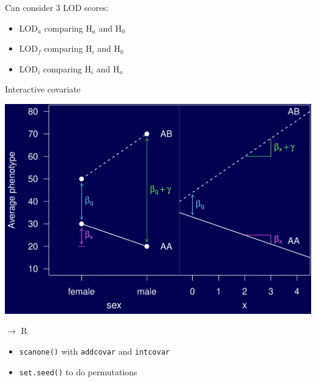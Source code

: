\documentclass[12pt]{article}
\newcommand{\headsize}{\fontsize{35}{35} \selectfont}
\newcommand{\smallsize}{\fontsize{25}{30} \selectfont}
\begin{document}
\hspace{0.5in}
\begin{minipage}{9.5in}
Can consider 3 LOD scores:
  \begin{itemize}
    \item LOD$_a$ comparing H$_a$ and H$_0$
    \item LOD$_f$ comparing H$_i$ and H$_0$
    \item LOD$_i$ comparing H$_i$ and H$_a$
  \end{itemize}
\end{minipage}

\newpage

\headsize \color{myyellow}
\hfill \begin{minipage}{5.75in}
\centering
Interactive covariate
\end{minipage}

\vfill

\centerline{\includegraphics{FigsA/intcovar.pdf}}


\newpage

\headsize \color{myyellow}
$\boldsymbol{\rightarrow}$ R

\vspace{3cm}

\color{mywhite} \smallsize

\hfill \begin{minipage}[t]{9.5in}
\begin{itemize}
\itemsep24pt
\item \verb|scanone()| with \verb|addcovar| and \verb|intcovar|
\item \verb|set.seed()| to do permutations
\end{itemize} \end{minipage}
\end{document}
